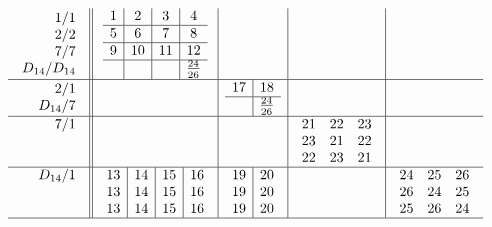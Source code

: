 \documentclass[12pt,a4paper]{amsart}
\begin{document}
\scriptsize {}
\begin{align*}
  \begin{array}{r||c|c|c|c}
    \begin{array}{r}
      1/1 \\ 2/2 \\ 7/7 \\ D_{14}/D_{14}
    \end{array}
    &
    \begin{array}{c|c|c|c}
1&2&3&4\\\hline
5&6&7&8\\\hline
9&10&11&12\\\hline
&&&^{\underline{24}}_{26}\\
    \end{array}
&&&\\\hline
    \begin{array}{r}
      2/1 \\ D_{14}/7
    \end{array}
&&
    \begin{array}{c|c}
      17&18\\\hline
      &^{\underline{24}}_{26}\\
    \end{array}
&&\\\hline
    \begin{array}{r}
      7/1 \\ \\ \\
    \end{array}
&
&
&
  \begin{array}{ccc}
21&22&23\\
23&21&22\\
22&23&21\\
  \end{array}
&\\\hline
    \begin{array}{r}
      D_{14}/1 \\  \\ \\
    \end{array}
&
    \begin{array}{c|c|c|c}
13&14&15&16\\
13&14&15&16\\
13&14&15&16\\
    \end{array}
&
    \begin{array}{c|c}
      19&20\\
      19&20\\
      19&20\\
    \end{array}
&
&
  \begin{array}{ccc}
24&25&26\\
26&24&25\\
25&26&24\\
  \end{array}
\\\hline
  \end{array}
\end{align*}
\end{document}
